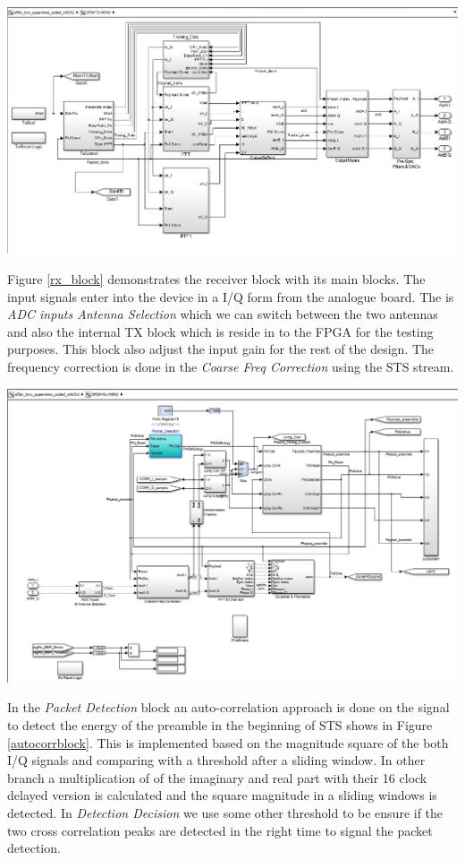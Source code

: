 \begin{center}
\includegraphics[width=\textwidth]{content/fig/txblock.JPG}
\label{tx_block}
\end{center}

Figure \ref{rx_block} demonstrates the receiver block with its main blocks. The input signals enter into the device in a I/Q form from the analogue board. The is \textit{ADC inputs Antenna Selection} which we can switch between the two antennas and also the internal TX block which is reside in to the FPGA for the testing purposes. This block also adjust the input gain for the rest of the design. The frequency correction is done in the \textit{Coarse Freq Correction} using the STS stream.  
\begin{center}
\includegraphics[width=\textwidth]{content/fig/rxblock.JPG}
\label{rx_block}
\end{center}



In the \textit{Packet Detection} block an auto-correlation approach is done on the signal to detect the energy of the preamble in the beginning of STS shows in Figure \ref{autocorrblock}. This is implemented based on the magnitude square of the both I/Q signals and comparing with a threshold after a sliding window. In other branch a multiplication of of the imaginary and real part with their 16 clock delayed version is calculated and the square magnitude in a sliding windows is detected. In \textit{Detection Decision} we use some other threshold to be ensure if the two cross correlation peaks are detected in the right time to signal the packet detection.

